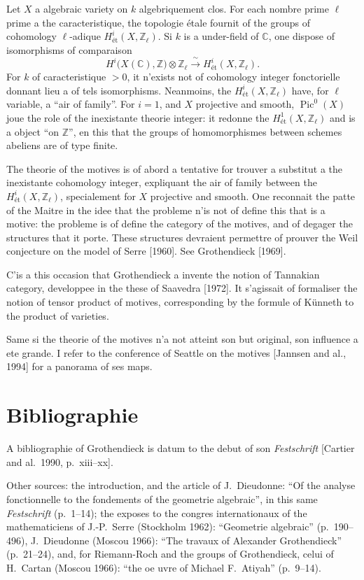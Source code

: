 \documentclass[11pt,a4paper]{article}
\theoremstyle{plain}
\theoremstyle{definition}
\DeclareMathOperator{\Pic}{Pic}
\begin{document}
Let $X$ a algebraic variety on $k$ algebriquement clos. For each nombre prime $\ell$ prime a the caracteristique, the topologie étale fournit of the groups of cohomology $\ell$-adique $H^i_{\text{\'et}}(X, \mathbb{Z}_\ell)$. Si $k$ is a under-field of $\mathbb{C}$, one dispose of isomorphisms of comparaison
\[
H^i\bigl(X(\mathbb{C}), \mathbb{Z}\bigr) \otimes \mathbb{Z}_\ell \xrightarrow{\;\sim\;} H^i_{\text{\'et}}(X, \mathbb{Z}_\ell).
\]
For $k$ of caracteristique $> 0$, it n'exists not of cohomology integer fonctorielle donnant lieu a of tels isomorphisms. Neanmoins, the $H^i_{\text{\'et}}(X, \mathbb{Z}_\ell)$ have, for $\ell$ variable, a ``air of family''. For $i=1$, and $X$ projective and smooth, $\Pic^0(X)$ joue the role of the inexistante theorie integer: it redonne the $H^1_{\text{\'et}}(X, \mathbb{Z}_\ell)$ and is a object ``on $\mathbb{Z}$'', en this that the groups of homomorphismes between schemes abeliens are of type finite.

The theorie of the motives is of abord a tentative for trouver a substitut a the inexistante cohomology integer, expliquant the air of family between the $H^i_{\text{\'et}}(X, \mathbb{Z}_\ell)$, specialement for $X$ projective and smooth. One reconnait the patte of the Maitre in the idee that the probleme n'is not of define this that is a motive: the probleme is of define the category of the motives, and of degager the structures that it porte. These structures devraient permettre of prouver the Weil conjecture on the model of Serre [1960]. See Grothendieck [1969].

C'is a this occasion that Grothendieck a invente the notion of Tannakian category, developpee in the these of Saavedra [1972]. It s'agissait of formaliser the notion of tensor product of motives, corresponding by the formule of K\"unneth to the product of varieties.

Same si the theorie of the motives n'a not atteint son but original, son influence a ete grande. I refer to the conference of Seattle on the motives [Jannsen and al., 1994] for a panorama of ses maps.

\section*{Bibliographie}

A bibliographie of Grothendieck is datum to the debut of son \emph{Festschrift} [Cartier and al.\ 1990, p.~xiii--xx].

Other sources: the introduction, and the article of J.~Dieudonne: ``Of the analyse fonctionnelle to the fondements of the geometrie algebraic'', in this same \emph{Festschrift} (p.~1--14); the exposes to the congres internationaux of the mathematiciens of J.-P.~Serre (Stockholm 1962): ``Geometrie algebraic'' (p.~190--496), J.~Dieudonne (Moscou 1966): ``The travaux of Alexander Grothendieck'' (p.~21--24), and, for Riemann-Roch and the groups of Grothendieck, celui of H.~Cartan (Moscou 1966): ``the oe uvre of Michael F.~Atiyah'' (p.~9--14).
\end{document}
